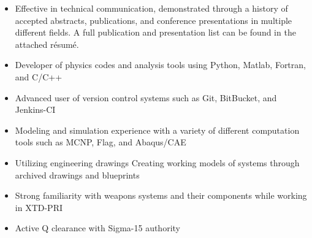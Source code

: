 \begin{center}
\begin{minipage}{\textwidth}
\begin{itemize}[leftmargin=.45in,rightmargin=.45in,itemsep=1.6mm]

	\item Effective in technical communication, demonstrated through a history of accepted abstracts, publications, and conference presentations in multiple different fields. A full publication and presentation list can be found in the attached r\'{e}sum\'{e}.

	\item Developer of physics codes and analysis tools using Python, Matlab, Fortran, and C/C++
	\item Advanced user of version control systems such as Git, BitBucket, and Jenkins-CI
	\item Modeling and simulation experience with a variety of different computation tools such as MCNP, Flag, and Abaqus/CAE
	\item Utilizing engineering drawings Creating working models of systems through archived drawings and blueprints
	\item Strong familiarity with weapons systems and their components while working in XTD-PRI
	\item Active Q clearance with Sigma-15 authority

  \end{itemize} 


\end{minipage}
\end{center}
